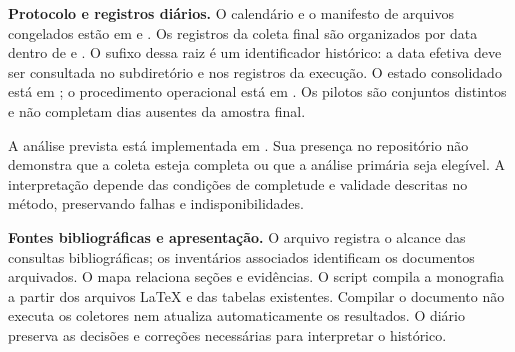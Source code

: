 \textbf{Protocolo e registros diários.}
O calendário e o manifesto de arquivos congelados estão em  e . Os registros da coleta final são organizados por data dentro de  e . O sufixo dessa raiz é um identificador histórico: a data efetiva deve ser consultada no subdiretório e nos registros da execução. O estado consolidado está em ; o procedimento operacional está em . Os pilotos são conjuntos distintos e não completam dias ausentes da amostra final.

A análise prevista está implementada em . Sua presença no repositório não demonstra que a coleta esteja completa ou que a análise primária seja elegível. A interpretação depende das condições de completude e validade descritas no método, preservando falhas e indisponibilidades.

\textbf{Fontes bibliográficas e apresentação.}
O arquivo  registra o alcance das consultas bibliográficas; os inventários associados identificam os documentos arquivados. O mapa  relaciona seções e evidências. O script  compila a monografia a partir dos arquivos LaTeX e das tabelas existentes. Compilar o documento não executa os coletores nem atualiza automaticamente os resultados. O diário  preserva as decisões e correções necessárias para interpretar o histórico.

\par\endgroup
